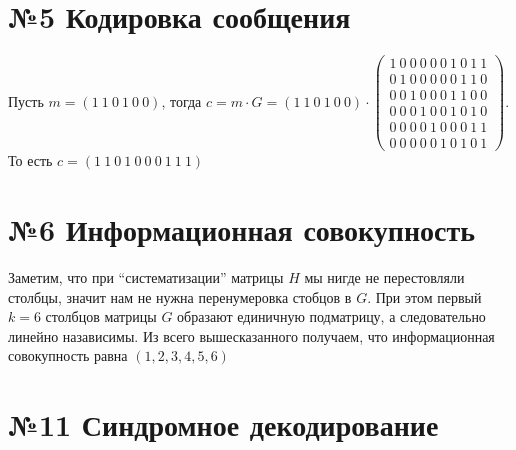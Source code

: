 \documentclass[fontsize=14pt]{article}
\begin{document}
\section*{№5 Кодировка сообщения}

Пусть $m = (1\ 1\ 0\ 1\ 0\ 0)$, тогда $c = m \cdot G = (1\ 1\ 0\ 1\ 0\ 0) \cdot
\begin{pmatrix}
		1\ 0\ 0\ 0\ 0\ 0\ 1\ 0\ 1\ 1\\
		0\ 1\ 0\ 0\ 0\ 0\ 0\ 1\ 1\ 0\\
		0\ 0\ 1\ 0\ 0\ 0\ 1\ 1\ 0\ 0\\
		0\ 0\ 0\ 1\ 0\ 0\ 1\ 0\ 1\ 0\\
		0\ 0\ 0\ 0\ 1\ 0\ 0\ 0\ 1\ 1\\
		0\ 0\ 0\ 0\ 0\ 1\ 0\ 1\ 0\ 1	
	\end{pmatrix}$.
То есть $c = (1\ 1\ 0\ 1\ 0\ 0\ 0\ 1\ 1\ 1)$
	
\section*{№6 Информационная совокупность}

Заметим, что при \enquote{систематизации} матрицы $H$ мы нигде не перестовляли столбцы, значит нам не нужна перенумеровка стобцов в $G$. При этом первый $k = 6$ столбцов матрицы $G$ образают единичную подматрицу, а следовательно линейно назависимы. Из всего вышесказанного получаем, что информационная совокупность равна $(1, 2, 3, 4, 5, 6)$  	

\section*{№11 Синдромное декодирование}
\end{document}
